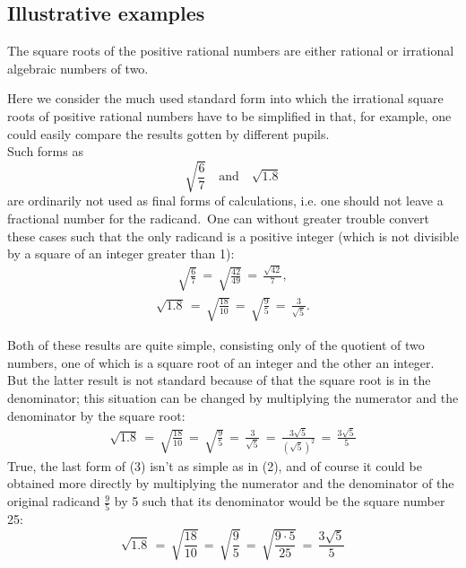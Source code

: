 \documentclass[12pt]{article}
\theoremstyle{definition}
\begin{document}

\subsection{Illustrative examples}
The square roots of the positive rational numbers are either rational or irrational algebraic numbers of  two.

Here we consider the much used standard form into which the irrational square roots of positive rational numbers have to be simplified in  that, for example, one could easily compare the results gotten by different pupils.\\


Such forms as
$$\sqrt{\frac{6}{7}} \quad \mbox{and} \quad \sqrt{1.8}$$
are ordinarily not used as final forms of calculations, i.e. one should not leave a fractional number for the radicand.\, One can without greater trouble convert these cases such that the only radicand is a positive integer (which is not divisible by a square of an integer greater than 1):
\begin{align}
\sqrt{\frac{6}{7}} \,=\, \sqrt{\frac{42}{49}} \,=\, \frac{\sqrt{42}}{7},
\end{align}
\begin{align}
\sqrt{1.8} \,=\, \sqrt{\frac{18}{10}} \,=\, \sqrt{\frac{9}{5}} \,=\, \frac{3}{\sqrt{5}}.
\end{align}

Both of these results are quite simple, consisting only of the quotient of two numbers, one of which is a square root of an integer and the other an integer.\, But the latter result is not standard because of that the square root is in the denominator; this situation can be changed by multiplying the numerator and the denominator by the square root:
\begin{align}
\sqrt{1.8} \,=\, \sqrt{\frac{18}{10}} \,=\, \sqrt{\frac{9}{5}} \,=\, \frac{3}{\sqrt{5}} 
\,=\, \frac{3\sqrt{5}}{(\sqrt{5})^2} \,=\, \frac{3\sqrt{5}}{5}
\end{align}
True, the last form of (3) isn't as simple as in (2), and of course it could be obtained more directly by multiplying the numerator and the denominator of the original  radicand $\frac{9}{5}$ by 5 such that its denominator would be the square number 25:
$$\sqrt{1.8} \,=\, \sqrt{\frac{18}{10}} \,=\, \sqrt{\frac{9}{5}} \,=\, \sqrt{\frac{9\cdot5}{25}} 
\,=\, \frac{3\sqrt{5}}{5}$$
\end{document}
